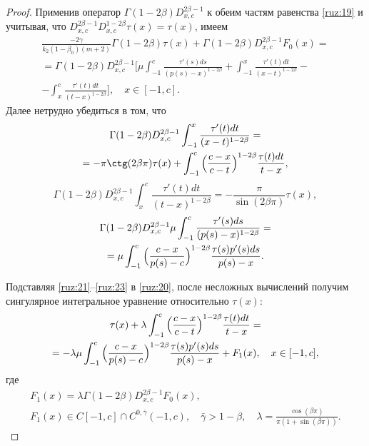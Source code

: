 \begin{proof}
Применив  оператор $\Gamma(1-2\beta)D_{x,c}^{2\beta-1}$ к обеим частям равенства \eqref{ruz:19} и учитывая, 
что $D_{x,c}^{2\beta-1}D_{x,c}^{1-2\beta}\tau(x)=\tau(x)$, имеем
\begin{multline}
\frac{-2\gamma}{k_2(1-\beta_0)(m+2)}\Gamma(1-2\beta)\tau(x)+\Gamma(1-2\beta)D_{x,c}^{2\beta-1}F_0(x)=
\\
=\Gamma(1-2\beta)D_{x,c}^{2\beta-1}\biggr[\mu\int_{-1}^c{\frac{\tau'(s)ds}{(p(s)-x)^{1-2\beta}}}+\int_{-1}^x{\frac{\tau'(t)dt}{(x-t)^{1-2\beta}}}- \\ -
\int_x^c{\frac{\tau'(t)dt}{(t-x)^{1-2\beta}}}\biggl], 
\quad 
x\in[-1, c].
\label{ruz:20}
\end{multline}
Далее нетрудно убедиться в том, что
\begin{multline}
\Gamma(1-2\beta)D_{x,c}^{2\beta-1}\int_{-1}^x{\frac{\tau'(t)dt}{(x-t)^{1-2\beta}}} = \\
=-\pi\ctg(2\beta\pi)\tau(x)+\int_{-1}^c{\Bigl(\frac{c-x}{c-t}\Bigr)^{1-2\beta}\frac{\tau(t)dt}{t - x}},
\label{ruz:21}
\end{multline}
\begin{equation}
\Gamma(1-2\beta)D_{x,c}^{2\beta-1}\int_x^c{\frac{\tau'(t)dt}{(t-x)^{1-2\beta}}}=-\frac{\pi}{\sin(2\beta\pi)}\tau(x),
\label{ruz:23}
\end{equation}
\begin{multline}
\Gamma(1-2\beta)D_{x,c}^{2\beta-1}\mu\int_{-1}^c{\frac{\tau'(s)ds}{(p(s)-x)^{1-2\beta}}} = \\
=\mu\int_{-1}^c{\Bigl(\frac{c-x}{p(s)-c}\Bigr)^{1-2\beta}\frac{\tau(s)p'(s)ds}{p(s)-x}}.
\label{ruz:23}
\end{multline}

\pagebreak

Подставляя \eqref{ruz:21}--\eqref{ruz:23} в \eqref{ruz:20}, после несложных вычислений получим
сингулярное интегральное уравнение относительно $\tau(x)$:
\begin{multline}
\tau(x)+\lambda\int_{-1}^c{\Bigl(\frac{c-x}{c-t}\Bigr)^{1-2\beta}\frac{\tau(t)dt}{t-x}}=
\\
=-\lambda\mu\int_{-1}^c{\Bigl(\frac{c-x}{p(s)-c}\Bigr)^{1-2\beta}\frac{\tau(s)p'(s)ds}{p(s)-x}}+F_1(x), \quad x\in[-1, c],
\label{ruz:24}
\end{multline}
где 
\begin{gather*}
F_1(x)=\lambda\Gamma(1-2\beta)D_{x,c}^{2\beta-1}F_0(x),
\\
F_1(x)\in C[-1,c]\cap C^{0,\bar\gamma}(-1,c), \quad \bar\gamma>1-\beta, \quad \lambda=\frac{\cos(\beta\pi)}{\pi(1+\sin(\beta\pi))}.
\end{gather*}


\end{proof}
